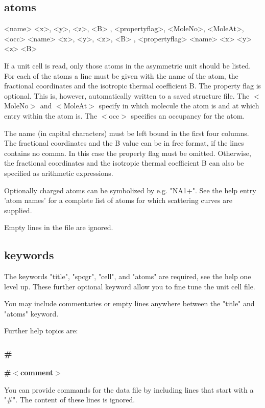 \subsection*{atoms}
\begin{MacVerbatim}
<name>  <x>, <y>, <z>, <B> , <propertyflag>, <MoleNo>, <MoleAt>, <occ>
<name>  <x>, <y>, <z>, <B> , <propertyflag>
<name>  <x>  <y>  <z>  <B>
\end{MacVerbatim}
If a unit cell is read, only those atoms in the asymmetric unit should 
be listed. 
For each of the atoms a line must be given with the name of the atom, 
the fractional coordinates and the isotropic thermal coefficient B. 
The property flag is optional. This is, however, automatically 
written to a saved structure file. 
The $ <$MoleNo$> $ and $ <$MoleAt$> $ specify in which molecule the atom is and 
at which entry within the atom is. 
The $ <$occ$> $ specifies an occupancy for the atom. 
\par
The name (in capital characters) must be left bound in the first four 
columns. 
The fractional coordinates and the B value can be in free format, if the 
lines contains no comma. In this case the property flag must be omitted. 
Otherwise, the fractional coordinates and the isotropic thermal 
coefficient B can also be specified as arithmetic expressions. 
\par
Optionally charged atoms can be symbolized by e.g. "NA1+". 
See the help entry 'atom names' for a complete list of atoms for which 
scattering curves are supplied. 
\par
Empty lines in the file are ignored. 
\subsection*{keywords}
\par
The keywords "title", "spcgr", "cell", and "atoms" are required, see 
the help one level up. These further optional keyword allow you to 
fine tune the unit cell file. 
\par
You may include commentaries or empty lines anywhere between the 
"title" and "atoms" keyword. 
\par
Further help topics are: 
\par
\subsubsection{\#}
{\bf \#$ <$comment$> $ \par }
\par
\vspace{3pt}
You can provide commands for the data file by including lines that 
start with a "\#". The content of these lines is ignored. 
\par
